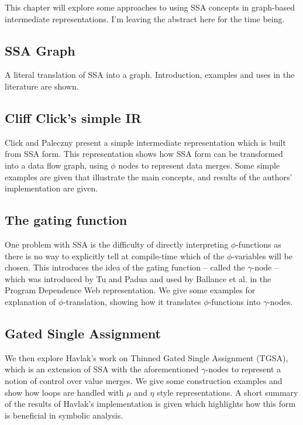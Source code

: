 This chapter will explore some approaches to using SSA concepts in graph-based intermediate representations. I'm leaving the abstract here for the time being.

\subsection*{SSA Graph}

A literal translation of SSA into a graph. Introduction, examples and uses in the literature are shown.

\subsection*{Cliff Click's simple IR}

Click and Paleczny  \cite{202534} present a simple intermediate representation which is built from SSA form. This representation shows how SSA form can be transformed into a data flow graph, using $\phi$ nodes to represent data merges. Some simple examples are given that illustrate the main concepts, and results of the authors' implementation are given.

\subsection*{The gating function}

One problem with SSA is the difficulty of directly interpreting $\phi$-functions as there is no way to explicitly tell at compile-time which of the $\phi$-variables will be chosen. This introduces the idea of the gating function -- called the $\gamma$-node -- which was introduced by Tu and Padua \cite{207115} and used by Ballance et al. in the Program Dependence Web\cite{93578} representation. We give some examples for explanation of $\phi$-translation, showing how it translates $\phi$-functions into $\gamma$-nodes.

\subsection*{Gated Single Assignment}

We then explore Havlak's work\cite{Havlak93constructionof} on Thinned Gated Single Assignment (TGSA), which is an extension of SSA with the aforementioned $\gamma$-nodes to represent a notion of control over value merges. We give some construction examples and show how loops are handled with $\mu$ and $\eta$ style representations. A short summary of the results of Havlak's implementation is given which highlights how this form is beneficial in symbolic analysis.

